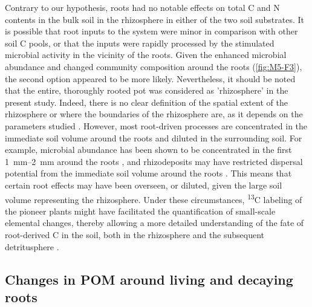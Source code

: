 Contrary to our hypothesis, roots had no notable effects on total C and N contents in the bulk soil in the rhizosphere in either of the two soil substrates. It is possible that root inputs to the system were minor in comparison with other soil C pools, or that the inputs were rapidly processed by the stimulated microbial activity in the vicinity of the roots. Given the enhanced microbial abundance and changed community composition around the roots (\ref{fig:M5-F3}), the second option appeared to be more likely. Nevertheless, it should be noted that the entire, thoroughly rooted pot was considered as 'rhizosphere' in the present study. Indeed, there is no clear definition of the spatial extent of the rhizosphere or where the boundaries of the rhizosphere are, as it depends on the parameters studied \citep{Kuzyakov2019}. However, most root-driven processes are concentrated in the immediate soil volume around the roots and diluted in the surrounding soil. For example, microbial abundance has been shown to be concentrated in the first \SIrange{1}{2}{\milli\metre} around the roots \citep{Marschner2012}, and rhizodeposits may have restricted dispersal potential from the immediate soil volume around the roots \citep{Kuzyakov2019}. This means that certain root effects may have been overseen, or diluted, given the large soil volume representing the rhizosphere. Under these circumstances, \textsuperscript{13}C labeling of the pioneer plants might have facilitated the quantification of small-scale elemental changes, thereby allowing a more detailed understanding of the fate of root-derived C in the soil, both in the rhizosphere and the subsequent detritusphere \citep{Teixeira2024}.

\subsection{Changes in POM around living and decaying roots}

